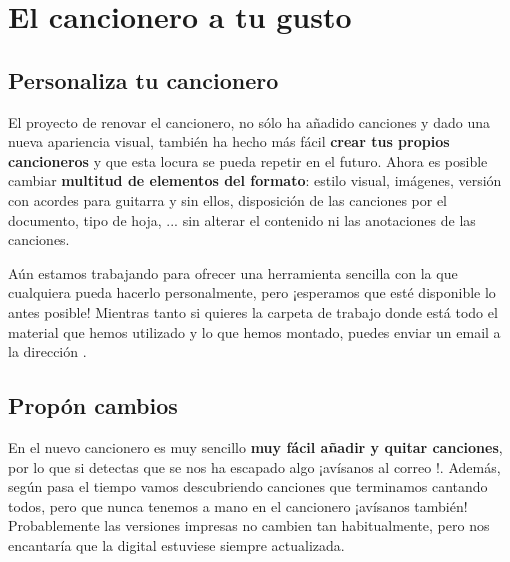 \section*{El cancionero a tu gusto}

\subsection*{Personaliza tu cancionero}
El proyecto de renovar el cancionero, no sólo ha añadido canciones y dado una nueva apariencia visual, también ha hecho más fácil \textbf{crear tus propios cancioneros} y que esta locura se pueda repetir en el futuro. Ahora es posible cambiar \textbf{multitud de elementos del formato}: estilo visual, imágenes, versión con acordes para guitarra y sin ellos, disposición de las canciones por el documento, tipo de hoja, ... sin alterar el contenido ni las anotaciones de las canciones.

Aún estamos trabajando para ofrecer una herramienta sencilla con la que cualquiera pueda hacerlo personalmente, pero ¡esperamos que esté disponible lo antes posible! Mientras tanto si quieres la carpeta de trabajo donde está todo el material que hemos utilizado y lo que hemos montado, puedes enviar un email a la dirección \mantaineremail. 

\subsection*{Propón cambios}
En el nuevo cancionero es muy sencillo \textbf{muy fácil añadir y quitar canciones}, por lo que si detectas que se nos ha escapado algo ¡avísanos al correo \mantaineremail!. Además, según pasa el tiempo vamos descubriendo canciones que terminamos cantando todos, pero que nunca tenemos a mano en el cancionero ¡avísanos también! Probablemente las versiones impresas no cambien tan habitualmente, pero nos encantaría que la digital estuviese siempre actualizada.

\newpage
\thispagestyle{empty}
\null
\newpage
\thispagestyle{empty}
\null
\newpage